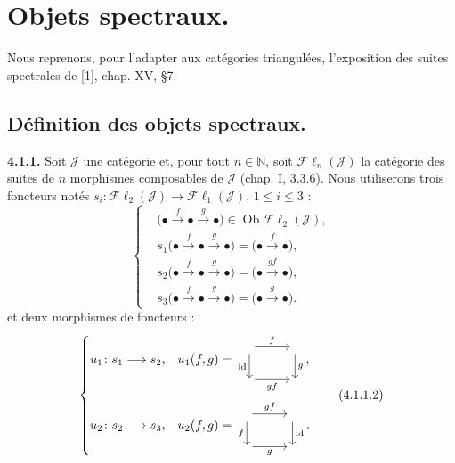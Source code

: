 \clearpage
{}%
\begingroup\small\setlength{\parskip}{0pt}\setlength{\emergencystretch}{1.5em}
\section{Objets spectraux.}

Nous reprenons, pour l'adapter aux catégories triangulées, l'exposition des
suites spectrales de [1], chap. XV, \S 7.

\subsection{Définition des objets spectraux.}

\medskip\noindent\textbf{4.1.1.}\quad
Soit $\mathcal J$ une catégorie et, pour tout $n\in\mathbb N$, soit
$\mathcal{F}\ell_n(\mathcal J)$ la catégorie des suites de $n$ morphismes
composables de $\mathcal J$ (chap. I, 3.3.6). Nous utiliserons trois
foncteurs notés
$s_i\colon\mathcal{F}\ell_2(\mathcal J)\to\mathcal{F}\ell_1(\mathcal J)$,
$1\leq i\leq3$ :
\[
\left\{
\begin{aligned}
&\bigl(\mathord\bullet\xrightarrow f\mathord\bullet\xrightarrow g\mathord\bullet\bigr)
   \in\operatorname{Ob}\mathcal{F}\ell_2(\mathcal J),\\
&s_1\bigl(\mathord\bullet\xrightarrow f\mathord\bullet\xrightarrow g\mathord\bullet\bigr)
   =\bigl(\mathord\bullet\xrightarrow f\mathord\bullet\bigr),\\
&s_2\bigl(\mathord\bullet\xrightarrow f\mathord\bullet\xrightarrow g\mathord\bullet\bigr)
   =\bigl(\mathord\bullet\xrightarrow{gf}\mathord\bullet\bigr),\\
&s_3\bigl(\mathord\bullet\xrightarrow f\mathord\bullet\xrightarrow g\mathord\bullet\bigr)
   =\bigl(\mathord\bullet\xrightarrow g\mathord\bullet\bigr).
\end{aligned}
\right.
\tag{4.1.1.1}
\]
et deux morphismes de foncteurs :
\[
\left\{
\begin{aligned}
&u_1\colon s_1\longrightarrow s_2,
&&u_1(f,g)=
\begin{tikzcd}[ampersand replacement=\&,column sep=2.8em,row sep=1.9em,baseline=(current bounding box.center)]
{}\arrow[r,"f"]\arrow[d,"\operatorname{id}"']\&{}\arrow[d,"g"]\\
{}\arrow[r,"gf"']\&{}
\end{tikzcd},\\[2pt]
&u_2\colon s_2\longrightarrow s_3,
&&u_2(f,g)=
\begin{tikzcd}[ampersand replacement=\&,column sep=2.8em,row sep=1.9em,baseline=(current bounding box.center)]
{}\arrow[r,"gf"]\arrow[d,"f"']\&{}\arrow[d,"\operatorname{id}"]\\
{}\arrow[r,"g"']\&{}
\end{tikzcd}.
\end{aligned}
\right.
\tag{4.1.1.2}
\]

